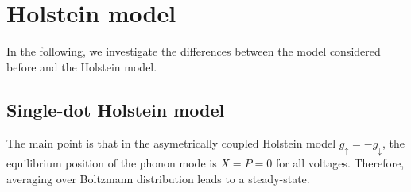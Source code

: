 \documentclass{article}
\newcommand{\pdagger}{{\phantom{\dagger}}}
\begin{document}
\section{Holstein model}
In the following, we investigate the differences between the model considered before and the Holstein model.
\subsection{Single-dot Holstein model}
The main point is that in the asymetrically coupled Holstein model $g_\uparrow =-g_\downarrow$, the equilibrium position of the phonon mode is $X=P=0$ for all voltages. Therefore, averaging over Boltzmann distribution leads to a steady-state.


\end{document}
